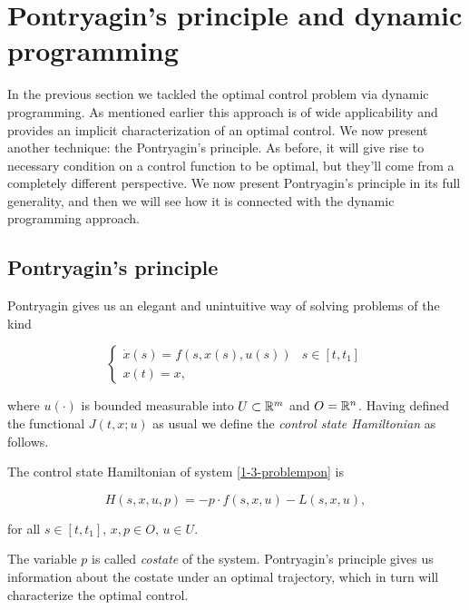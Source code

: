 \section{Pontryagin's principle and dynamic programming}\label{Section: Pontryagin Principle}

In the previous section we tackled the optimal control problem via dynamic programming.
As mentioned earlier this approach is of wide applicability and provides an implicit 
characterization of an optimal control. We now present another technique: the Pontryagin's principle.
As before, it will give rise to necessary condition on a control function 
to be optimal, but they'll come from a completely different perspective. We now present Pontryagin's 
principle in its full generality, and then we will see how it is connected with 
the dynamic programming approach. 

\subsection{Pontryagin's principle}

Pontryagin gives us an elegant and unintuitive way of solving problems of the kind

\begin{equation}\label{1-3-problempon}
    \begin{cases}
        \dot{x}(s) = f(s,x(s),u(s)) & s\in [t,t_1] \\
        x(t) = x,
    \end{cases}
\end{equation}

where $u(\cdot)$ is bounded measurable into $U\subset\mathbb{R}^m$ and $O=\mathbb{R}^n$. Having defined the 
functional $J(t,x;u)$ as usual we define the \textit{control state Hamiltonian} 
as follows.

\begin{definition}
    The control state Hamiltonian of system \eqref{1-3-problempon} is

    \begin{equation}\label{1-3-hamiltonian}
        H(s,x,u,p) = - p \cdot f(s,x,u) - L(s,x,u),
    \end{equation}

    for all $s\in[t,t_1],\,x,p\in O,\,u\in U$.
\end{definition}

The variable $p$ is called \textit{costate} of the system. Pontryagin's principle 
gives us information about the costate under an optimal trajectory, which in turn will 
characterize the optimal control. 

